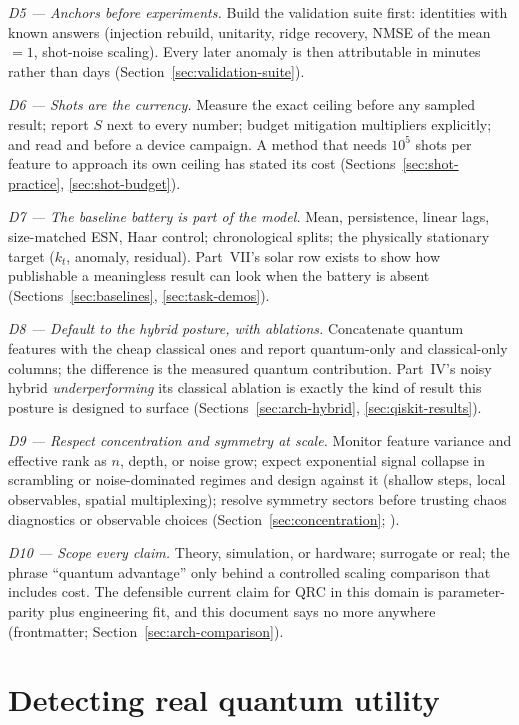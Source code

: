 \emph{D5 --- Anchors before experiments.} Build the validation suite first:
identities with known answers (injection rebuild, unitarity, ridge recovery,
NMSE of the mean $=1$, shot-noise scaling). Every later anomaly is then
attributable in minutes rather than days
(Section~\ref{sec:validation-suite}).

\emph{D6 --- Shots are the currency.} Measure the exact ceiling before any
sampled result; report $S$ next to every number; budget mitigation
multipliers explicitly; and read \citet{hu2023tackling} and
\citet{ahmed2025optimal} before a device campaign. A method that needs
$10^5$ shots per feature to approach its own ceiling has stated its cost
(Sections~\ref{sec:shot-practice}, \ref{sec:shot-budget}).

\emph{D7 --- The baseline battery is part of the model.} Mean, persistence,
linear lags, size-matched ESN, Haar control; chronological splits; the
physically stationary target ($k_t$, anomaly, residual). Part~VII's solar
row exists to show how publishable a meaningless result can look when the
battery is absent (Sections~\ref{sec:baselines}, \ref{sec:task-demos}).

\emph{D8 --- Default to the hybrid posture, with ablations.} Concatenate
quantum features with the cheap classical ones and report quantum-only and
classical-only columns; the difference is the measured quantum
contribution. Part~IV's noisy hybrid \emph{underperforming} its classical
ablation is exactly the kind of result this posture is designed to surface
(Sections~\ref{sec:arch-hybrid}, \ref{sec:qiskit-results}).

\emph{D9 --- Respect concentration and symmetry at scale.} Monitor feature
variance and effective rank as $n$, depth, or noise grow; expect exponential
signal collapse in scrambling or noise-dominated regimes and design against
it (shallow steps, local observables, spatial multiplexing); resolve
symmetry sectors before trusting chaos diagnostics or observable choices
(Section~\ref{sec:concentration};
\citealp{sannia2025exponential,xiong2025role,mcclean2018barren}).

\emph{D10 --- Scope every claim.} Theory, simulation, or hardware; surrogate
or real; the phrase ``quantum advantage'' only behind a controlled scaling
comparison that includes cost. The defensible current claim for QRC in this
domain is parameter-parity plus engineering fit, and this document says no
more anywhere (frontmatter; Section~\ref{sec:arch-comparison}).

\section{Detecting real quantum utility}
\label{sec:detecting-utility}

